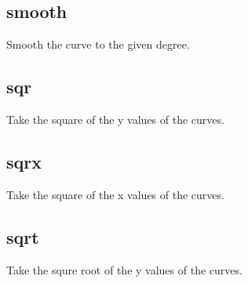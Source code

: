 \documentclass[letterpaper,10pt,english]{sphinxmanual}
\begin{document}
\subsection{smooth}
\label{\detokenize{math_operations:smooth}}
Smooth the curve to the given degree.

\begin{sphinxVerbatim}[commandchars=\\\{\}]
\PYG{p}{[}\PYG{p}{]}   \PYG{p}{[}\PYG{p}{]}
\end{sphinxVerbatim}


\subsection{sqr}
\label{\detokenize{math_operations:sqr}}
Take the square of the y values of the curves.

\begin{sphinxVerbatim}[commandchars=\\\{\}]
\PYG{p}{[}\PYG{p}{]}  
\end{sphinxVerbatim}


\subsection{sqrx}
\label{\detokenize{math_operations:sqrx}}
Take the square of the x values of the curves.

\begin{sphinxVerbatim}[commandchars=\\\{\}]
\PYG{p}{[}\PYG{p}{]}  
\end{sphinxVerbatim}


\subsection{sqrt}
\label{\detokenize{math_operations:sqrt}}
Take the squre root of the y values of the curves.

\begin{sphinxVerbatim}[commandchars=\\\{\}]
\PYG{p}{[}\PYG{p}{]}  
\end{sphinxVerbatim}
\end{document}
